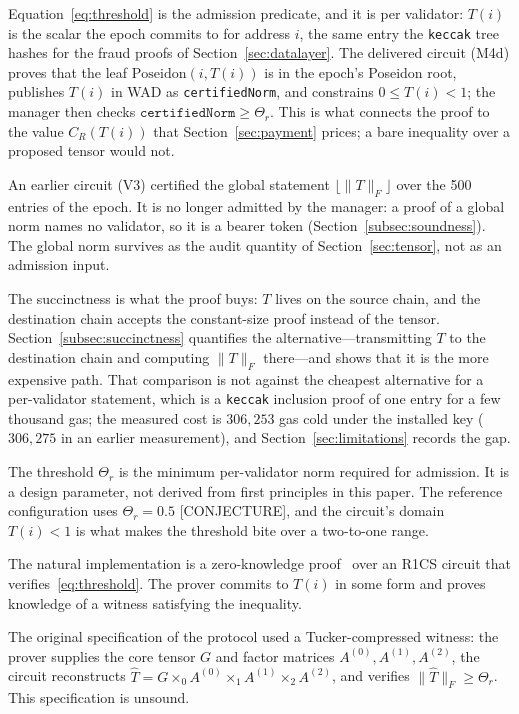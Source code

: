 \documentclass[11pt,a4paper]{article}
\numberwithin{equation}{section}
\numberwithin{table}{section}
\begin{document}
Equation~\eqref{eq:threshold} is the admission predicate, and it is per validator: $T(i)$ is the scalar the epoch commits to for address $i$, the same entry the \texttt{keccak} tree hashes for the fraud proofs of Section~\ref{sec:datalayer}. The delivered circuit (M4d) proves that the leaf $\mathrm{Poseidon}(i, T(i))$ is in the epoch's Poseidon root, publishes $T(i)$ in WAD as \texttt{certifiedNorm}, and constrains $0 \leq T(i) < 1$; the manager then checks $\texttt{certifiedNorm} \geq \Theta_r$. This is what connects the proof to the value $C_R(T(i))$ that Section~\ref{sec:payment} prices; a bare inequality over a proposed tensor would not.

An earlier circuit (V3) certified the global statement $\lfloor\|T\|_F\rfloor$ over the 500 entries of the epoch. It is no longer admitted by the manager: a proof of a global norm names no validator, so it is a bearer token (Section~\ref{subsec:soundness}). The global norm survives as the audit quantity of Section~\ref{sec:tensor}, not as an admission input.

The succinctness is what the proof buys: $T$ lives on the source chain, and the destination chain accepts the constant-size proof instead of the tensor. Section~\ref{subsec:succinctness} quantifies the alternative---transmitting $T$ to the destination chain and computing $\|T\|_F$ there---and shows that it is the more expensive path. That comparison is not against the cheapest alternative for a per-validator statement, which is a \texttt{keccak} inclusion proof of one entry for a few thousand gas; the measured cost is $306{,}253$ gas cold under the installed key ($306{,}275$ in an earlier measurement), and Section~\ref{sec:limitations} records the gap.

The threshold $\Theta_r$ is the minimum per-validator norm required for admission. It is a design parameter, not derived from first principles in this paper. The reference configuration uses $\Theta_r = 0.5$ [CONJECTURE], and the circuit's domain $T(i) < 1$ is what makes the threshold bite over a two-to-one range.

The natural implementation is a zero-knowledge proof~\cite{gmr1985} over an R1CS circuit that verifies~\eqref{eq:threshold}. The prover commits to $T(i)$ in some form and proves knowledge of a witness satisfying the inequality.

The original specification of the protocol used a Tucker-compressed witness: the prover supplies the core tensor $G$ and factor matrices $A^{(0)}, A^{(1)}, A^{(2)}$, the circuit reconstructs $\hat{T} = G \times_0 A^{(0)} \times_1 A^{(1)} \times_2 A^{(2)}$, and verifies $\|\hat{T}\|_F \geq \Theta_r$. This specification is unsound.
\end{document}
